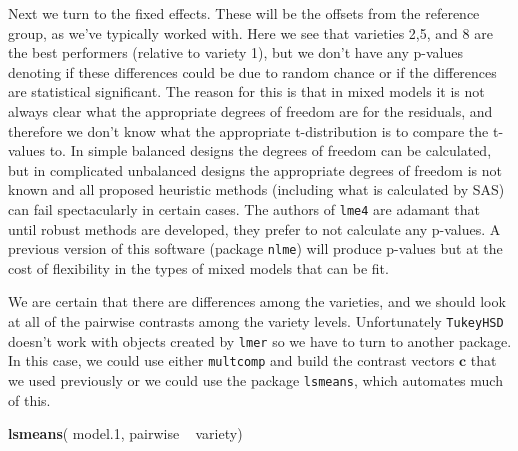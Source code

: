 \documentclass[]{book}
\newenvironment{Shaded}{\begin{snugshade}}{\end{snugshade}}
\newcommand{\KeywordTok}[1]{\textcolor[rgb]{0.13,0.29,0.53}{\textbf{{#1}}}}
\newcommand{\FloatTok}[1]{\textcolor[rgb]{0.00,0.00,0.81}{{#1}}}
\newcommand{\StringTok}[1]{\textcolor[rgb]{0.31,0.60,0.02}{{#1}}}
\newcommand{\NormalTok}[1]{{#1}}
\theoremstyle{definition}
\theoremstyle{definition}
\theoremstyle{remark}
\begin{document}
Next we turn to the fixed effects. These will be the offsets from the
reference group, as we've typically worked with. Here we see that
varieties 2,5, and 8 are the best performers (relative to variety 1),
but we don't have any p-values denoting if these differences could be
due to random chance or if the differences are statistical significant.
The reason for this is that in mixed models it is not always clear what
the appropriate degrees of freedom are for the residuals, and therefore
we don't know what the appropriate t-distribution is to compare the
t-values to. In simple balanced designs the degrees of freedom can be
calculated, but in complicated unbalanced designs the appropriate
degrees of freedom is not known and all proposed heuristic methods
(including what is calculated by SAS) can fail spectacularly in certain
cases. The authors of \texttt{lme4} are adamant that until robust
methods are developed, they prefer to not calculate any p-values. A
previous version of this software (package \texttt{nlme}) will produce
p-values but at the cost of flexibility in the types of mixed models
that can be fit.

We are certain that there are differences among the varieties, and we
should look at all of the pairwise contrasts among the variety levels.
Unfortunately \texttt{TukeyHSD} doesn't work with objects created by
\texttt{lmer} so we have to turn to another package. In this case, we
could use either \texttt{multcomp} and build the contrast vectors
\(\boldsymbol{c}\) that we used previously or we could use the package
\texttt{lsmeans}, which automates much of this.

\begin{Shaded}
\begin{Highlighting}[]
\KeywordTok{lsmeans}\NormalTok{( model}\FloatTok{.1}\NormalTok{, pairwise ~}\StringTok{ }\NormalTok{variety)}
\end{Highlighting}
\end{Shaded}
\end{document}
